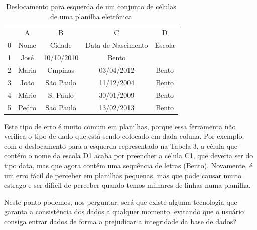 \documentclass[
12pt,		%
openright,	%
twoside,  %
a4paper,			%
chapter=TITLE,		%
english,			%
french,				%
spanish,			%
brazil				%
]{USPSC-classe/USPSC}
\begin{document}
\begin{table}[htb]
\tiny
\caption{\label{f6feaa39313aa0691b7fdadc84175a203e68bf77}Deslocamento para esquerda de um conjunto de c\'elulas de uma planilha eletr\^onica}

\centering
\begin{tabular}{|c|c|c|c|c|}
\hline
  &  A  &  B  &  C  &  D  \\
0 & Nome  &  Cidade  &  Data de Nascimento  &  Escola \\
1 & Jos\'e  &  10/10/2010  &  Bento  &   \\
2 & Maria  &  Cmpinas  &  03/04/2012  &  Bento \\
3 & Jo\~ao  &  S\~ao Paulo  &  11/12/2004  &  Bento \\
4 & M\'ario  &  S. Paulo  &  30/01/2009  &  Bento \\
5 & Pedro  &  Sao Paulo  &  13/02/2013  &  Bento \\
\hline
\end{tabular}
\end{table}


Este tipo de erro \'e muito comum em  planilhas, porque essa ferramenta n\~ao verifica o tipo de dado que est\'a sendo colocado em dada coluna. Por exemplo, com o deslocamento para a esquerda representado na Tabela 3, a c\'elula que cont\'em o nome da escola D1 acaba por preencher a c\'elula C1, que deveria ser do tipo data, mas que agora cont\'em uma sequ\^encia de letras (\textquotedbl Bento\textquotedbl ). Novamente, \'e um erro f\'acil de perceber em planilhas pequenas, mas que pode causar muito estrago e ser dif\'{\i}cil de perceber quando temos milhares de linhas numa planilha.

















Neste ponto podemos, nos perguntar: ser\'a que existe alguma tecnologia que garanta a consist\^encia dos dados a qualquer momento, evitando que o usu\'ario consiga entrar dados de forma a prejudicar a integridade da base de dados?
\end{document}
